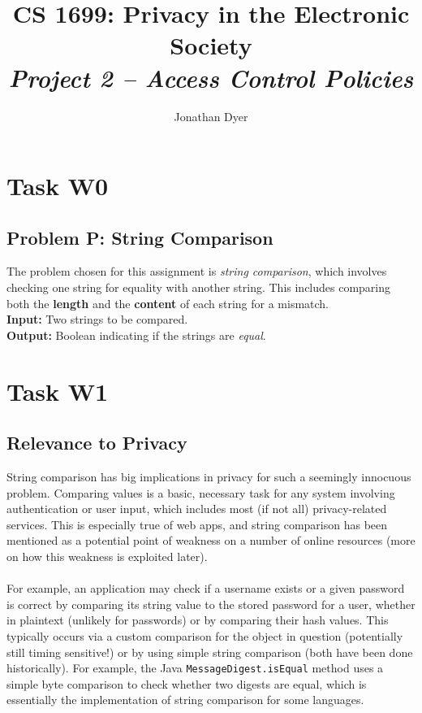 \documentclass{article}
\author{Jonathan Dyer}
\title{CS 1699: Privacy in the Electronic Society \\
        \textit{Project 2 -- Access Control Policies}}
\providecommand{\inlinecode}{\texttt}
\begin{document}
\maketitle

\tableofcontents

\section{Task W0}
\subsection{Problem P: String Comparison}
The problem chosen for this assignment is \textit{string comparison}, which involves checking one string for equality with another string.
This includes comparing both the \textbf{length} and the \textbf{content} of each string for a mismatch. \\
\textbf{Input:  } Two strings to be compared. \\
\textbf{Output: } Boolean indicating if the strings are \textit{equal}.

\section{Task W1}
\subsection{Relevance to Privacy}

String comparison has big implications in privacy for such a seemingly innocuous problem. Comparing values is a basic, necessary task for any system involving authentication or user input, which includes most (if not all) privacy-related services. This is especially true of web apps, and string comparison has been mentioned as a potential point of weakness on a number of online resources (more on how this weakness is exploited later). \cite{thisdata} \\
  \\
For example, an application may check if a username exists or a given password is correct by comparing its string value to the stored password for a user, whether in plaintext (unlikely for passwords) or by comparing their hash values. This typically occurs via a custom comparison for the object in question (potentially still timing sensitive!) or by using simple string comparison (both have been done historically). \cite{codahale} For example, the Java \inlinecode{MessageDigest.isEqual} method uses a simple byte comparison to check whether two digests are equal, which is essentially the implementation of string comparison for some languages.
\end{document}
